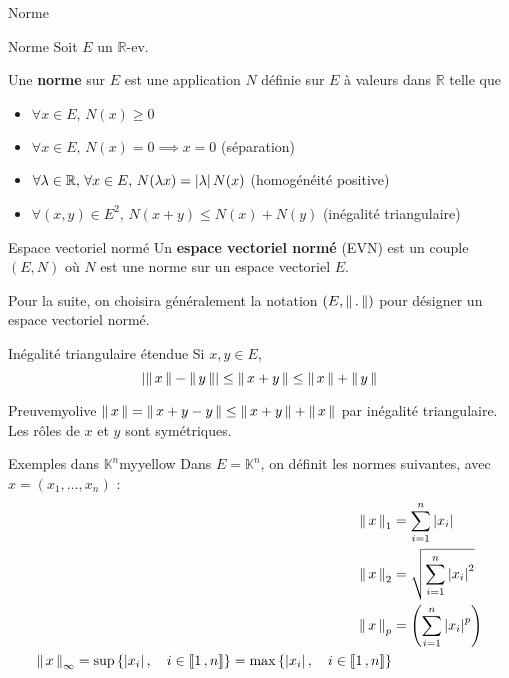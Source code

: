     \begin{defi}{Norme}
        \begin{defi}{Norme}{}
            Soit $E$ un $\mathbb{R}$-ev.
            
            Une \textbf{norme} sur $E$ est une application $N$ définie sur $E$ à valeurs dans $\mathbb{R}$ telle que 
            \begin{itemize}
                \item $\forall x \in E, \, N(x) \geq 0$
                \item $\forall x \in E, \, N(x) = 0 \implies x = 0$ \quad (séparation)
                \item $\forall \lambda \in \mathbb{R}, \, \forall x \in E, \, N(\lambda x) = \abs{\lambda}N(x)$ \quad (homogénéité positive)
                \item $\forall (x,y) \in E^2, \, N(x+y) \leq N(x) + N(y)$ \quad (inégalité triangulaire)
            \end{itemize}
        \end{defi}
    \end{defi}

    \begin{defi}{Espace vectoriel normé}{}
        Un \textbf{espace vectoriel normé} (EVN) est un couple $(E, N)$ où $N$ est une norme sur un espace vectoriel $E$.
    \end{defi}

    Pour la suite, on choisira généralement la notation $(E, \norm{.})$ pour désigner un espace vectoriel normé.

    \begin{prop}{Inégalité triangulaire étendue}{}
        Si $x,y \in E$, 
        \[ \abs{\norm{x} - \norm{y}} \leq \norm{x + y} \leq \norm{x} + \norm{y} \]   
    \end{prop}
    
    \begin{demo}{Preuve}{myolive}
        $\norm{x} = \norm{x + y - y} \leq \norm{x + y} + \norm{x}$ par inégalité triangulaire. Les rôles de $x$ et $y$ sont symétriques.
    \end{demo}

    \begin{omed}{Exemples dans $\mathbb{K}^n$}{myyellow}
        Dans $E = \mathbb{K}^n$, on définit les normes suivantes, avec $x = (x_1,\ldots,x_n)$ :
        \begin{align*}
            \nnorm{1}{x} &= \sum_{i=1}^{n} \abs{x_i} \\
            \nnorm{2}{x} &= \sqrt{\sum_{i=1}^{n} \abs{x_i}^2} \\
            \nnorm{p}{x} &= \left(\sum_{i=1}^{n} \abs{x_i}^p\right) \\
            \nnorm{\infty}{x} = \sup\left\{\abs{x_i}, \quad i \in \intervalleEntier{1}{n}\right\} = \max\left\{\abs{x_i}, \quad i \in \intervalleEntier{1}{n}\right\}
        \end{align*}
    \end{omed}

